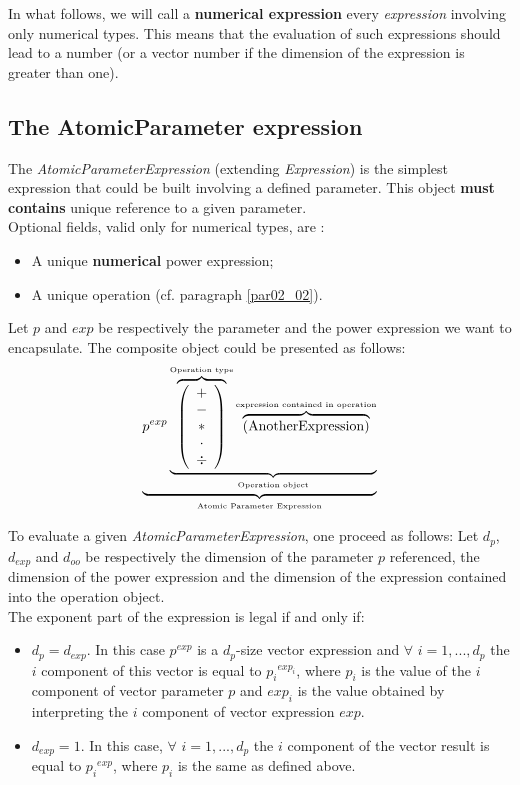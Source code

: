 \documentclass[a4paper,11pt] {article}
\begin{document}
 In what follows, we will call a {\bf numerical expression} every {\it expression} involving only numerical types. This means that the evaluation of such expressions should lead to a number (or a vector number if the dimension of the expression is greater than one).\\


\subsection{The AtomicParameter expression}\label{par02_01}
The {\it AtomicParameterExpression} (extending {\it Expression}) is the simplest expression that could be built involving a defined parameter. This object {\bf must contains} unique reference to a given parameter.\\

Optional fields, valid only for numerical types, are : 
\begin{itemize}
\item A unique {\bf numerical} power expression;
\item A unique operation (cf. paragraph \ref{par02_02}).\\
\end{itemize}
Let $p$ and $exp$ be respectively the parameter and the power expression we want to encapsulate. The composite object could be presented as follows:
\begin{equation}\label{eq01}
 \underbrace{  p^{exp} \underbrace{  \overbrace{\left( \begin{array}{c} + \\ - \\ \ast  \\ \cdot \\ \div   \end{array} \right) }^{\mbox{\tiny Operation type}}
 \overbrace{    \left( \mbox{AnotherExpression}\right) }^{\mbox{\tiny expression contained in operation}}   }_{\mbox{\tiny Operation object}}}_{\mbox{\tiny Atomic Parameter Expression}}
\end{equation}

To evaluate a given {\it AtomicParameterExpression}, one proceed as follows: 
Let $d_p$, $d_{exp}$ and $d_{oo}$ be respectively the dimension of the parameter $p$ referenced, the dimension of the power expression and the dimension of the expression contained into the operation object.\\
The exponent part of the expression is legal if and only if:
\begin{itemize}
\item $d_p=d_{exp}$. In this case $p^{exp}$ is a $d_p$-size vector expression and $\forall$ $i=1,...,d_p$ the $i$ component of this vector is equal to ${p_i}^{exp_i}$, where $p_i$ is the value of the $i$ component of vector parameter $p$ and $exp_i$ is the value obtained by interpreting the $i$ component of vector expression $exp$.
\item $d_{exp}=1$. In this case, $\forall$ $i=1,...,d_p$ the $i$ component of the vector result is equal to ${p_i}^{exp}$, where $p_i$ is the same as defined above.\\
\end{itemize} 
\end{document}
